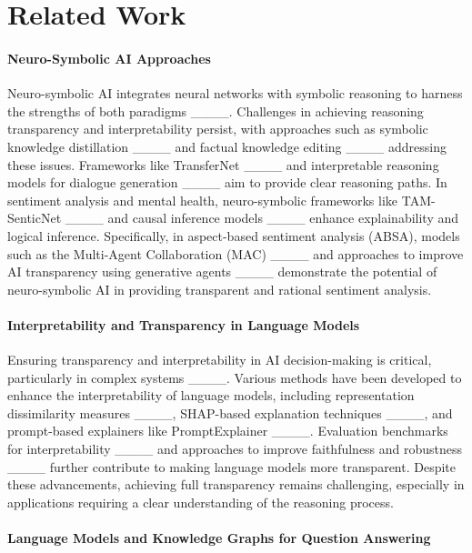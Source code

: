 \section{Related Work}
\label{sec:related}

\paragraph{Neuro-Symbolic AI Approaches}

Neuro-symbolic AI integrates neural networks with symbolic reasoning to harness the strengths of both paradigms ____. Challenges in achieving reasoning transparency and interpretability persist, with approaches such as symbolic knowledge distillation ____ and factual knowledge editing ____ addressing these issues. Frameworks like TransferNet ____ and interpretable reasoning models for dialogue generation ____ aim to provide clear reasoning paths. In sentiment analysis and mental health, neuro-symbolic frameworks like TAM-SenticNet ____ and causal inference models ____ enhance explainability and logical inference. Specifically, in aspect-based sentiment analysis (ABSA), models such as the Multi-Agent Collaboration (MAC) ____ and approaches to improve AI transparency using generative agents ____ demonstrate the potential of neuro-symbolic AI in providing transparent and rational sentiment analysis.

\paragraph{Interpretability and Transparency in Language Models}

Ensuring transparency and interpretability in AI decision-making is critical, particularly in complex systems ____. Various methods have been developed to enhance the interpretability of language models, including representation dissimilarity measures ____, SHAP-based explanation techniques ____, and prompt-based explainers like PromptExplainer ____. Evaluation benchmarks for interpretability ____ and approaches to improve faithfulness and robustness ____ further contribute to making language models more transparent. Despite these advancements, achieving full transparency remains challenging, especially in applications requiring a clear understanding of the reasoning process.

\paragraph{Language Models and Knowledge Graphs for Question Answering}

